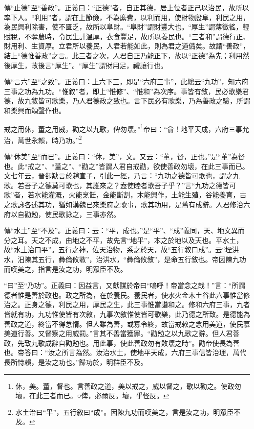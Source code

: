 {\noindent\zhuan{}\fzbyks 傳“止德”至“善政”。正義曰：“正德”者，自正其德，居上位者正己以治民，故所以率下人。“利用”者，謂在上節儉，不為縻費，以利而用，使財物殷阜，利民之用，為民興利除害，使不匱乏，故所以阜財。“阜財”謂財豐大也。“厚生”謂薄徵徭，輕賦稅，不奪農時，令民生計溫厚，衣食豐足，故所以養民也。“三者和”謂德行正、財用利、生資厚。立君所以養民，人君若能如此，則為君之道備矣。故謂“善政”，結上“德惟善政”之言。此三者之次，人君自正乃能正下，故以“正德”為先；利用然後厚生，故後言“厚生”。“厚生”謂財用足，禮讓行也。 \par}

{\noindent\zhuan{}\fzbyks 傳“言六”至“之致”。正義曰：上六下三，即是“六府三事”，此總云“九功”，知六府三事之功為九功。“惟敘”者，即上“惟修”、“惟和”為次序。事皆有敘，民必歌樂君德，故九敘皆可歌樂，乃人君德政之致也。言下民必有歌樂，乃為善政之驗，所謂和樂興而頌聲作也。 \par}

戒之用休，董之用威，勸之以九歌，俾勿壞。”\footnote{休，美。董，督也。言善政之道，美以戒之，威以督之，歌以勸之。使政勿壞，在此三者而已。○俾，必爾反。壞，乎怪反。}帝曰：“俞！地平天成，六府三事允治，萬世永賴，時乃功。”\footnote{水土治曰“平”，五行敘曰“成”。因陳九功而嘆美之，言是汝之功，明眾臣不及。}

{\noindent\zhuan{}\fzbyks 傳“休美”至“而已”。正義曰：“休，美”，文。又云：“董，督，正也。”是“董”為督也。此“戒之”、“董之”、“勸之”皆謂人君自戒勸，欲使善政勿壞，在此三事而已。文七年云，晉卻缺言於趙宣子，引此一經，乃言：“九功之德皆可歌也，謂之九歌。若吾子之德莫可歌也，其誰來之？盍使睦者歌吾子乎？”言“九功之德皆可歌”者，若水能灌溉，火能烹飪，金能斷割，木能興作，土能生殖，谷能養育，古之歌詠各述其功，猶如漢魏已來樂府之歌事，歌其功用，是舊有成辭。人君修治六府以自勸勉，使民歌詠之，三事亦然。 \par}

{\noindent\zhuan{}\fzbyks 傳“水土”至“不及”。正義曰：云：“平，成也。”是“平”、“成”義同，天、地文異而分之耳。天之不成，由地之不平，故先言“地平”，本之於地以及天也。平水土，故“水土治曰平”。五行之神，佐天治物，系之於天，故“五行敘曰成”。云“堙洪水，汩陳其五行，彝倫攸斁”，治洪水，“彝倫攸敘”，是命五行敘也。帝因陳九功而嘆美之，指言是汝之功，明眾臣不及。 \par}

{\noindent\shu{}\fzkt “曰”至“乃功”。正義曰：因益言，又獻謀於帝曰“嗚呼！帝當念之哉！”言：“所謂德者惟是善於政也。政之所為，在於養民。養民者，使水火金木土谷此六事惟當修治之。正身之德，利民之用，厚民之生，此三事惟當諧和之。修和六府三事，九者皆就有功，九功惟使皆有次敘，九事次敘惟使皆可歌樂，此乃德之所致。是德能為善政之道，終當不得怠惰。但人雖為善，或寡令終，故當戒敕之念用美道，使民慕美道行善。又督察之用威罰。”言其不善當獲罪。“勸勉之以九歌之辭。但人君善政，先致九歌成辭自勸勉也。用此事，使此善政勿有敗壞之時”。勸帝使長為善也。帝答曰：“汝之所言為然。汝治水土，使地平天成，六府三事信皆治理，萬代長所恃賴，是汝之功也。”歸功於，明群臣不及。 \par}

